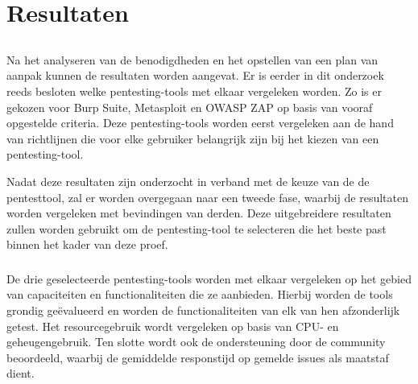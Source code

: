
\chapter{Resultaten}%
\label{ch:resultaten}

\section{}
Na het analyseren van de benodigdheden en het opstellen van een plan van aanpak kunnen de resultaten worden aangevat. Er is 
eerder in dit onderzoek reeds besloten welke pentesting-tools met elkaar vergeleken worden. Zo is er gekozen voor Burp Suite, Metasploit en 
OWASP ZAP op basis van vooraf opgestelde criteria. Deze pentesting-tools worden eerst vergeleken aan de hand van richtlijnen 
die voor elke gebruiker belangrijk zijn bij het kiezen van een pentesting-tool.

Nadat deze resultaten zijn onderzocht in verband met de keuze van de de pentesttool, zal er worden overgegaan naar een tweede 
fase, waarbij de resultaten worden vergeleken met bevindingen van derden. Deze uitgebreidere resultaten zullen worden gebruikt 
om de pentesting-tool te selecteren die het beste past binnen het kader van deze proef.

\subsection{}
De drie geselecteerde pentesting-tools worden met elkaar vergeleken op het gebied van capaciteiten en functionaliteiten die 
ze aanbieden. Hierbij worden de tools grondig geëvalueerd en worden de functionaliteiten van elk van hen afzonderlijk getest. Het 
resourcegebruik wordt vergeleken op basis van CPU- en geheugengebruik. Ten slotte wordt ook de ondersteuning door de 
community beoordeeld, waarbij de gemiddelde responstijd op gemelde issues als maatstaf dient.

